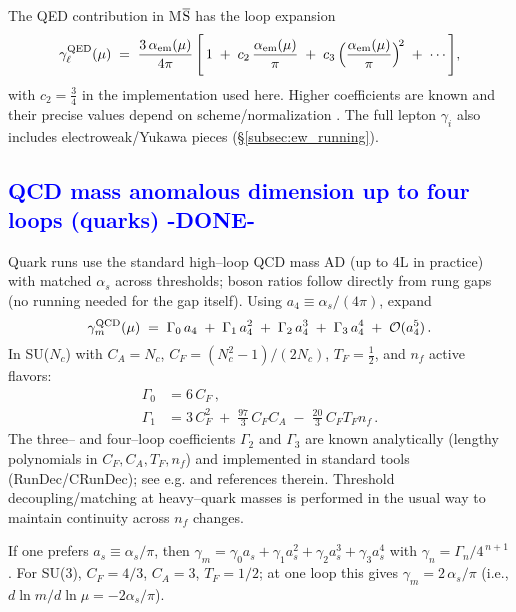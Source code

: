\documentclass[%
 amsmath,amssymb,
 aps,
prb,
floatfix, showkeys
]{revtex4-2}
\newcommand{\modif}[1]{\textcolor{blue}{#1}}
\begin{document}
The QED contribution in M$\overline{\rm S}$ has the loop expansion
\begin{equation}
  \gamma_{\ell}^{\rm QED}(\mu) \;=\; \frac{3\,\alpha_{\rm em}(\mu)}{4\pi}\,\Bigg[\,1\;+\;
  c_2\,\frac{\alpha_{\rm em}(\mu)}{\pi}\;+\;c_3\,\Big(\frac{\alpha_{\rm em}(\mu)}{\pi}\Big)^{\!2}\;+\;\cdots\Bigg],
  \label{eq:qed_gamma_series}
\end{equation}
with $c_2=\tfrac{3}{4}$ in the implementation used here.
Higher coefficients are known and their precise values depend on scheme/normalization
\cite{ChetyrkinKuehnSteinhauser2000,HerrenSteinhauser2018}.
The full lepton $\gamma_i$ also includes electroweak/Yukawa pieces (\S\ref{subsec:ew_running}).







{\modif{
\subsection{QCD mass anomalous dimension up to four loops (quarks) -DONE-}   
\label{subsec:qcd_ad}
}}
Quark runs use the standard high--loop QCD mass AD (up to 4L in practice)
with matched $\alpha_s$ across thresholds;
boson ratios follow directly from rung gaps (no running needed for the gap itself).
Using $a_4 \equiv \alpha_s/(4\pi)$, expand
\begin{equation}
  \gamma_{m}^{\rm QCD}(\mu) \;=\; \Gamma_0\,a_4 \;+\; \Gamma_1\,a_4^{2} \;+\; \Gamma_2\,a_4^{3} \;+\; \Gamma_3\,a_4^{4} \;+\; \mathcal{O}(a_4^{5})\,.
  \label{eq:qcd_gamma_general}
\end{equation}
In SU($N_c$) with $C_A=N_c$, $C_F=(N_c^2-1)/(2N_c)$, $T_F=\tfrac{1}{2}$, and $n_f$ active flavors:
\begin{align}
  \Gamma_0 &= 6\,C_F\,,\label{eq:qcd_G0}\\
  \Gamma_1 &= 3\,C_F^2 \;+\; \frac{97}{3}\,C_F C_A \;-\; \frac{20}{3}\,C_F T_F n_f\,.\label{eq:qcd_G1}
\end{align}
The three– and four–loop coefficients $\Gamma_2$ and $\Gamma_3$ are known analytically (lengthy polynomials in $C_F,C_A,T_F,n_f$) and implemented in standard tools (RunDec/CRunDec); see e.g.
\cite{ChetyrkinKuehnSteinhauser2000,HerrenSteinhauser2018}  and references therein.
Threshold decoupling/matching at heavy–quark masses is performed in the usual way to maintain continuity across $n_f$ changes.


If one prefers $a_s\equiv\alpha_s/\pi$, then $\gamma_m = \gamma_0 a_s + \gamma_1 a_s^2 + \gamma_2 a_s^3 + \gamma_3 a_s^4$ with $\gamma_n=\Gamma_n/4^{\,n+1}$. For SU(3), $C_F=4/3$, $C_A=3$, $T_F=1/2$; at one loop this gives $\gamma_m=2\,\alpha_s/\pi$ (i.e., $d\ln m/d\ln\mu = -2\alpha_s/\pi$).
\end{document}
